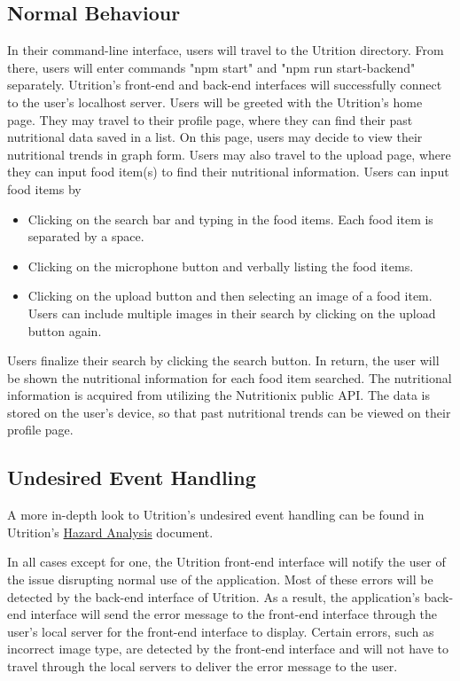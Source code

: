 \documentclass[12pt, titlepage]{article}
\begin{document}
\subsection{Normal Behaviour}

In their command-line interface, users will travel to the Utrition directory. From there, users will enter commands "npm start" and "npm run start-backend" separately. Utrition's front-end and back-end interfaces will successfully connect to the user's localhost server. Users will be greeted with the Utrition's home page. They may travel to their profile page, where they can find their past nutritional data saved in a list. On this page, users may decide to view their nutritional trends in graph form. Users may also travel to the upload page, where they can input food item(s) to find their nutritional information. Users can input food items by 
\begin{itemize}
	\item Clicking on the search bar and typing in the food items. Each food item is separated by a space.
	\item Clicking on the microphone button and verbally listing the food items.
	\item Clicking on the upload button and then selecting an image of a food item. Users can include multiple images in their search by clicking on the upload button again.
\end{itemize}
Users finalize their search by clicking the search button. In return, the user will be shown the nutritional information for each food item searched. The nutritional information is acquired from utilizing the Nutritionix public API. The data is stored on the user's device, so that past nutritional trends can be viewed on their profile page.

\subsection{Undesired Event Handling}


A more in-depth look to Utrition's undesired event handling can be found in Utrition's \href{../../HazardAnalysis/HazardAnalysis.pdf}{Hazard Analysis} document.

In all cases except for one, the Utrition front-end interface will notify the user of the issue disrupting normal use of the application. Most of these errors will be detected by the back-end interface of Utrition. As a result, the application's back-end interface will send the error message to the front-end interface through the user's local server for the front-end interface to display. Certain errors, such as incorrect image type, are detected by the front-end interface and will not have to travel through the local servers to deliver the error message to the user. 
\end{document}

